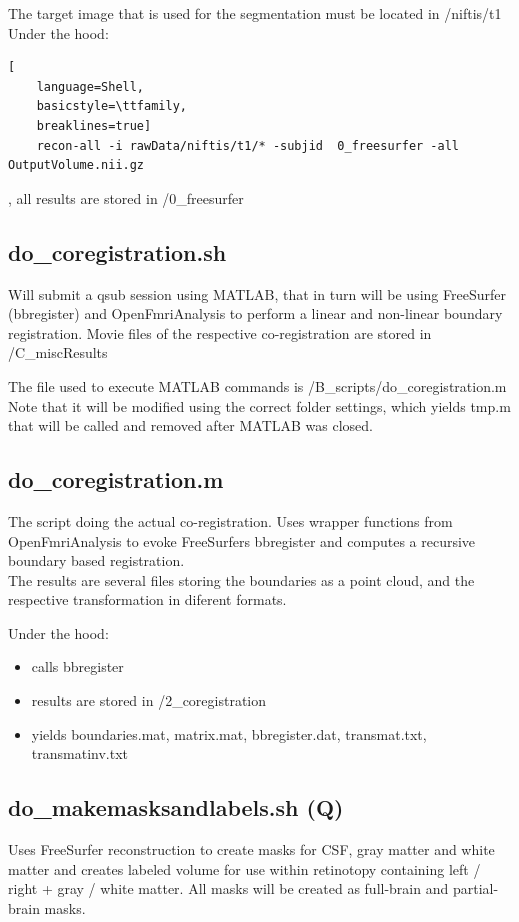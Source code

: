 \documentclass[12pt,a4paper]{scrartcl}
\begin{document}
\noindent The target image that is used for the segmentation must be located in /niftis/t1\\

\noindent Under the hood:
\begin{lstlisting}[
    language=Shell,
    basicstyle=\ttfamily,
    breaklines=true]
    recon-all -i rawData/niftis/t1/* -subjid  0_freesurfer -all OutputVolume.nii.gz
\end{lstlisting}
, all results are stored in /0\_freesurfer

\subsection{do\_coregistration.sh}
\label{sec:coreg}
Will submit a qsub session using MATLAB, that in turn will be using FreeSurfer (bbregister) and OpenFmriAnalysis to perform a linear and non-linear boundary registration.  Movie files of the respective co-registration are stored in /C\_miscResults

\noindent The file used to execute MATLAB commands is /B\_scripts/do\_coregistration.m Note that it will be modified using the correct folder settings, which yields tmp.m that will be called and removed after MATLAB was closed.\\

\subsection{do\_coregistration.m}
The script doing the actual co-registration. Uses wrapper functions from OpenFmriAnalysis to evoke FreeSurfers bbregister and computes a recursive boundary based registration.\\

\noindent The results are several files storing the boundaries as a point cloud, and the respective transformation in diferent formats.

\noindent Under the hood:
\begin{itemize}
\item calls bbregister
\item results are stored in /2\_coregistration
\item yields boundaries.mat, matrix.mat, bbregister.dat, transmat.txt, transmatinv.txt
\end{itemize}

\subsection{do\_makemasksandlabels.sh (Q)}
\label{sec:msklbl}
Uses FreeSurfer reconstruction to create masks for CSF, gray matter and white matter and creates labeled volume for use within retinotopy containing left / right + gray / white matter. All masks will be created as full-brain and partial-brain masks.\\
\end{document}
